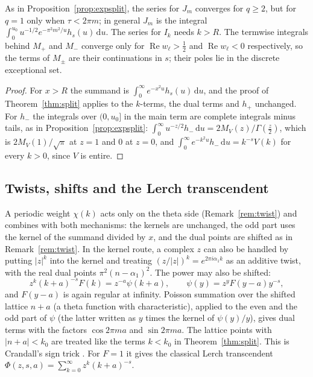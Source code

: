 \documentclass[11pt,reqno]{amsart}
\theoremstyle{definition}
\theoremstyle{remark}
\newcommand{\dd}{\,\mathrm{d}}
\begin{document}
As in Proposition~\ref{prop:expsplit}, the series for $J_m$ converges for $q \ge 2$, but for $q = 1$ only when
$\tau < 2\pi m$; in general $J_m$ is the integral $\int_0^{u_0}u^{-1/2}e^{-\pi^2m^2/u}h_s(u)\dd u$. The series for
$I_k$ needs $k > R$. The termwise integrals behind $M_+$ and $M_-$ converge only for $\operatorname{Re}w_\ell > \frac12$
and $\operatorname{Re}w_\ell < 0$ respectively, so the terms of $M_\pm$ are their continuations in $s$; their poles
lie in the discrete exceptional set.

\begin{proof}
For $x > R$ the summand is $\int_0^\infty e^{-x^2u}h_s(u)\dd u$, and the proof of Theorem~\ref{thm:split} applies to
the $k$-terms, the dual terms and $h_+$ unchanged. For $h_-$ the integrals over $(0,u_0]$ in the main term are complete
integrals minus tails, as in Proposition~\ref{prop:expsplit}: $\int_0^\infty u^{-z/2}h_-\dd u = 2M_V(z)/\Gamma(\frac z2)$,
which is $2M_V(1)/\sqrt\pi$ at $z = 1$ and $0$ at $z = 0$, and $\int_0^\infty e^{-k^2u}h_-\dd u = k^{-s}V(k)$ for every
$k > 0$, since $V$ is entire.
\end{proof}

\subsection{Twists, shifts and the Lerch transcendent}\label{sec:twistshift}
A periodic weight $\chi(k)$ acts only on the theta side (Remark~\ref{rem:twist}) and combines with both mechanisms:
the kernels are unchanged, the odd part uses the kernel of the summand divided by $x$, and the dual points are shifted
as in Remark~\ref{rem:twist}. In the kernel route, a complex $z$ can also be handled by putting $|z|^k$ into the kernel
and treating $(z/|z|)^k = e^{2\pi i\alpha_1k}$ as an additive twist, with the real dual points $\pi^2(n-\alpha_1)^2$.
The power may also be shifted:
\[
  z^k(k+a)^{-s}F(k) = z^{-a}\psi(k+a), \qquad \psi(y) = z^yF(y-a)y^{-s},
\]
and $F(y-a)$ is again regular at infinity. Poisson summation over the shifted lattice $n + a$ (a theta function with
characteristic), applied to the even and the odd part of $\psi$ (the latter written as $y$ times the kernel of
$\psi(y)/y$), gives dual terms with the factors $\cos 2\pi ma$ and $\sin 2\pi ma$. The lattice points with
$|n+a| < k_0$ are treated like the terms $k < k_0$ in Theorem~\ref{thm:split}. This is Crandall's sign trick
\cite[\S2.4]{Cra12}. For $F = 1$ it gives the classical Lerch transcendent $\Phi(z,s,a) = \sum_{k=0}^{\infty}z^k(k+a)^{-s}$.
\end{document}
